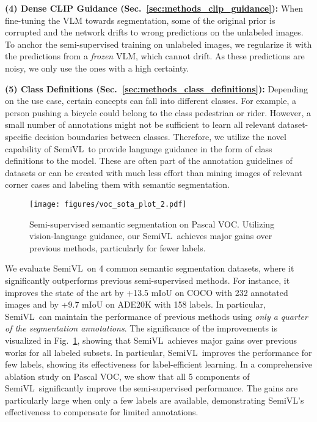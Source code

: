 \documentclass[10pt,twocolumn,letterpaper]{article}
\newcommand{\ours}{SemiVL}
\begin{document}
\noindent\textbf{(4) Dense CLIP Guidance (Sec.~\ref{sec:methods_clip_guidance}):}
When fine-tuning the VLM towards segmentation, some of the original prior is corrupted and the network drifts to wrong predictions on the unlabeled images.
To anchor the semi-supervised training on unlabeled images, we regularize it with the predictions from a \emph{frozen} VLM, which cannot drift. As these predictions are noisy, we only use the ones with a high certainty.


\noindent\textbf{(5) Class Definitions (Sec.~\ref{sec:methods_class_definitions}):}
Depending on the use case, certain concepts can fall into different classes. For example, a person pushing a bicycle could belong to the class pedestrian or rider.
However, a small number of annotations might not be sufficient to learn all relevant dataset-specific decision boundaries between classes. 
Therefore, we utilize the novel capability of \ours\ to provide language guidance in the form of class definitions to the model. These are often part of the annotation guidelines of datasets or can be created with much less effort than mining images of relevant corner cases and labeling them with semantic segmentation.


\begin{figure}
    \centering
    \texttt{[image: figures/voc\_sota\_plot\_2.pdf]}
    \caption{Semi-supervised semantic segmentation on Pascal VOC. Utilizing vision-language guidance, our \ours\ achieves major gains over previous methods, particularly for fewer labels.}
    \label{fig:sota_voc}
\end{figure}

We evaluate \ours\ on 4 common semantic segmentation datasets, where it significantly outperforms previous semi-supervised methods. For instance, it improves the state of the art by +13.5 mIoU on COCO with 232 annotated images and by +9.7 mIoU on ADE20K with 158 labels. In particular, \ours\ can maintain the performance of previous methods using \textit{only a quarter of the segmentation annotations}. The significance of the improvements is visualized in Fig.~\ref{fig:sota_voc}, showing that \ours\ achieves major gains over previous works for all labeled subsets. In particular, \ours\ improves the performance for few labels, showing its effectiveness for label-efficient learning. 
In a comprehensive ablation study on Pascal VOC, we show that all 5 components of \ours\ significantly improve the semi-supervised performance. The gains are particularly large when only a few labels are available, demonstrating \ours's effectiveness to compensate for limited annotations.
\end{document}
